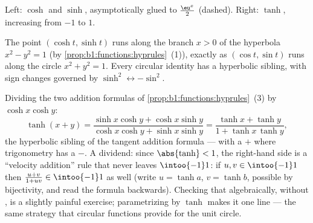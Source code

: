 \begin{omfigure}

{\small Left: $\cosh$ and $\sinh$, asymptotically glued to
$\frac{\eu^x}{2}$ (dashed). Right: $\tanh$, increasing from $-1$ to
$1$.}
\end{omfigure}

\begin{remark}
The point $(\cosh t, \sinh t)$ runs along the branch $x > 0$ of the
hyperbola $x^2 - y^2 = 1$ (by
\cref{prop:b1:functions:hyprules}~(1)), exactly as $(\cos t, \sin
t)$ runs along the circle $x^2 + y^2 = 1$. Every circular identity has
a hyperbolic sibling, with sign changes governed by
$\sinh^2 \leftrightarrow -\sin^2$.
\end{remark}

\begin{example}\label{ex:b1:functions:tanhadd}
Dividing the two addition formulas of
\cref{prop:b1:functions:hyprules}~(3) by $\cosh x\cosh y$:
\[
\tanh(x + y)
= \frac{\sinh x\cosh y + \cosh x\sinh y}
{\cosh x\cosh y + \sinh x\sinh y}
= \frac{\tanh x + \tanh y}{1 + \tanh x\,\tanh y} ,
\]
the hyperbolic sibling of the tangent addition formula --- with a
$+$ where trigonometry has a $-$. A dividend: since $\abs{\tanh}
< 1$, the right-hand side is a ``velocity addition'' rule that
never leaves $\intoo{-1}1$: if $u, v \in \intoo{-1}1$ then
$\frac{u + v}{1 + uv} \in \intoo{-1}1$ as well (write $u = \tanh
a$, $v = \tanh b$, possible by bijectivity, and read the formula
backwards). Checking that algebraically, without , is a slightly painful exercise; parametrizing by
$\tanh$ makes it one line --- the same strategy that circular
functions provide for the unit circle.
\end{example}

